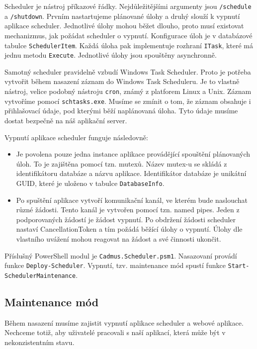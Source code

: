 Scheduler je nástroj příkazové řádky. Nejdůležitějšími argumenty jsou \texttt{/schedule} a \texttt{/shutdown}. Prvním nastartujeme plánované úlohy a druhý slouží k vypnutí aplikace scheduler. Jednotlivé úlohy mohou běžet dlouho, proto musí existovat mechanizmus, jak požádat scheduler o vypnutí. Konfigurace úloh je v databázové tabulce \texttt{SchedulerItem}. Každá úloha pak implementuje rozhraní \texttt{ITask}, které má jednu metodu \texttt{Execute}. Jednotlivé úlohy jsou spouštěny asynchronně. 

Samotný scheduler pravidelně vzbudí Windows Task Scheduler. Proto je potřeba vytvořit během nasazení záznam do Windows Task Scheduleru. Je to vlastně nástroj, velice podobný nástroju \texttt{cron}, známý z platforem Linux a Unix. Záznam vytvoříme pomocí \texttt{schtasks.exe}. Musíme se zmínit o tom, že záznam obsahuje i přihlašovací údaje, pod kterými běží naplánovaná úloha. Tyto údaje musíme dostat bezpečně na náš aplikační server.

Vypnutí aplikace scheduler funguje následovně: 

\begin{itemize}
\item Je povolena pouze jedna instance aplikace provádějící spouštění plánovaných úloh. To je zajištěna pomocí tzn. mutexů. Název mutex-u se skládá z identifikátoru databáze a názvu aplikace. Identifikátor databáze je unikátní GUID, které je uloženo v tabulce \texttt{DatabaseInfo}.
\item Po spuštění aplikace vytvoří komunikační kanál, ve kterém bude naslouchat různé žádosti. Tento kanál je vytvořen pomocí tzn. named pipes. Jeden z podporovaných žádostí je žádost vypnutí. Po obdržení žádosti scheduler nastaví CancellationToken a tím požádá běžící úlohy o vypnutí. Úlohy dle vlastního uvážení mohou reagovat na žádost a své činnosti ukončit. 
\end{itemize}

Příslušný PowerShell modul je \texttt{Cadmus.Scheduler.psm1}. Nasazovaní provádí funkce \texttt{Deploy-Scheduler}. Vypnutí, tzv. maintenance mód spustí funkce \texttt{Start-SchedulerMaintenance}.

\subsection{Maintenance mód}
Během nasazení musíme zajistit vypnutí aplikace scheduler a webové aplikace. Nechceme totiž, aby uživatelé pracovali s naší aplikací, která může být v nekonzistentním stavu.

